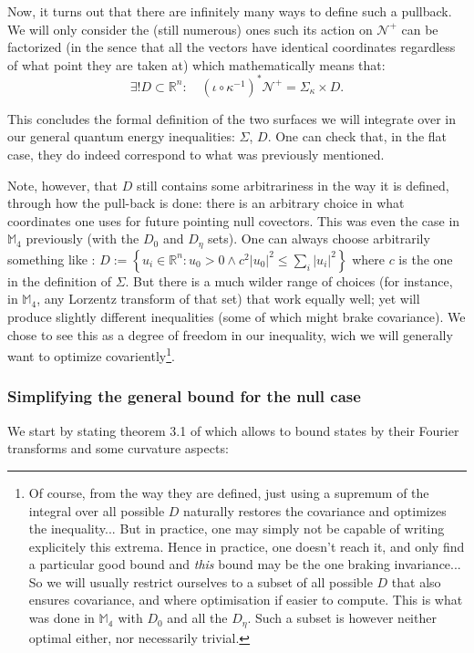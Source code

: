 \documentclass[a4paper,11pt]{article}
\numberwithin{equation}{section}
\theoremstyle{definition}
\begin{document}
Now, it turns out that there are infinitely many ways to define such a pullback. We will only consider the (still numerous) ones such its action on $\mathcal{N}^+$ can be factorized (in the sence that all the vectors have identical coordinates regardless of what point they are taken at) which mathematically means that:
$$\exists ! D \subset \mathbb{R}^n : \quad (\iota \circ \kappa^{-1})^*\mathcal{N}^+ =  \Sigma_\kappa \times D.$$

This concludes the formal definition of the two surfaces we will integrate over in our general quantum energy inequalities: $\Sigma$, $D$. One can check that, in the flat case, they do indeed correspond to what was previously mentioned.

Note, however, that $D$ still contains some arbitrariness in the way it is defined, through how the pull-back is done: there is an arbitrary choice in what coordinates one uses for future pointing null covectors. This was even the case in $\mathbb{M}_4$ previously (with the $D_0$ and $D_\eta$ sets). One can always choose arbitrarily something like :
$D:= \left\{u_i \in \mathbb{R}^n : u_0 >0 \wedge c^2 |u_0|^2 \leq \sum_i |u_i|^2 \right\}$
where $c$ is the one in the definition of $\Sigma$. But there is a much wilder range of choices (for instance, in $\mathbb{M}_4$, any Lorzentz transform of that set) that work equally well; yet will produce slightly different inequalities (some of which might brake covariance). We chose to see this as a degree of freedom in our inequality, wich we will generally want to optimize covariently\footnote{Of course, from the way they are defined, just using a supremum of the integral over all possible $D$ naturally restores the covariance and optimizes the inequality... But in practice, one may simply not be capable of writing explicitely this extrema. Hence in practice, one doesn't reach it, and only find a particular good bound and \emph{this} bound may be the one braking invariance... So we will usually restrict ourselves to a subset of all possible $D$ that also ensures covariance, and where optimisation if easier to compute. This is what was done in $\mathbb{M_4}$ with $D_0$ and all the $D_\eta$. Such a subset is however neither optimal either, nor necessarily trivial.}.






\subsubsection{Simplifying the general bound for the null case}
We start by stating theorem 3.1 of \cite{FourBound} which allows to bound states by their Fourier transforms and some curvature aspects:
\end{document}
